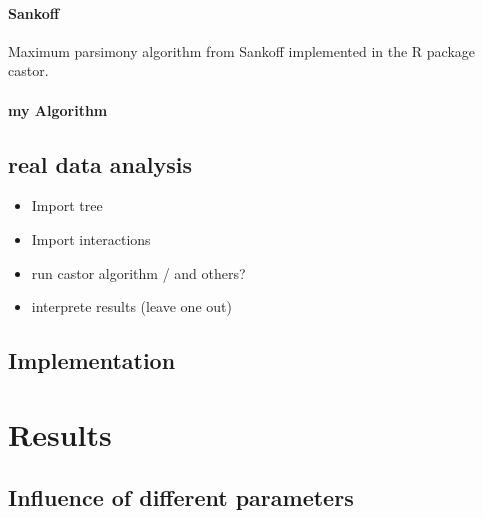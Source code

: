       \subsubsection{Sankoff}
        Maximum parsimony algorithm from Sankoff implemented in the R package castor.
      
      \subsubsection{my Algorithm}

  \section{real data analysis}
    \begin{itemize}
      \item Import tree
      \item Import interactions
      \item run castor algorithm / and others?
      \item interprete results (leave one out)
    \end{itemize}

  \section{Implementation}

\chapter{Results}

  \section{Influence of different parameters}

